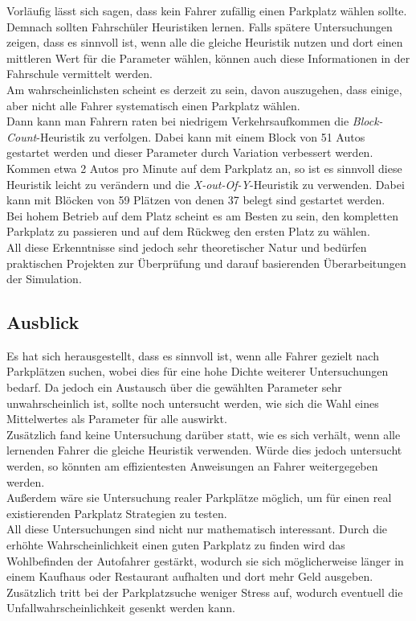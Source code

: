 Vorläufig lässt sich sagen, dass kein Fahrer zufällig einen Parkplatz wählen sollte. Demnach sollten Fahrschüler Heuristiken lernen. Falls spätere Untersuchungen zeigen, dass es sinnvoll ist, wenn alle die gleiche Heuristik nutzen und dort einen mittleren Wert für die Parameter wählen, können auch diese Informationen in der Fahrschule vermittelt werden.\\
Am wahrscheinlichsten scheint es derzeit zu sein, davon auszugehen, dass einige, aber nicht alle Fahrer systematisch einen Parkplatz wählen. \\
 Dann kann man Fahrern raten bei niedrigem Verkehrsaufkommen die \emph{Block-Count}-Heuristik zu verfolgen. Dabei kann mit einem Block von 51 Autos gestartet werden und dieser Parameter durch Variation verbessert werden.\\
 Kommen etwa 2 Autos pro Minute auf dem Parkplatz an, so ist es sinnvoll diese Heuristik leicht zu verändern und die \emph{X-out-Of-Y}-Heuristik zu verwenden. Dabei kann mit Blöcken von 59 Plätzen von denen 37 belegt sind gestartet werden.\\
 Bei hohem Betrieb auf dem Platz scheint es am Besten zu sein, den kompletten Parkplatz zu passieren und auf dem Rückweg den ersten Platz zu wählen.\\
All diese Erkenntnisse sind jedoch sehr theoretischer Natur und bedürfen praktischen Projekten zur Überprüfung und darauf basierenden Überarbeitungen der Simulation. 
 
 \subsection{Ausblick}

Es hat sich herausgestellt, dass es sinnvoll ist, wenn alle Fahrer gezielt nach Parkplätzen suchen, wobei dies für eine hohe Dichte weiterer Untersuchungen bedarf. Da jedoch ein Austausch über die gewählten Parameter sehr unwahrscheinlich ist, sollte noch untersucht werden, wie sich die Wahl eines Mittelwertes als Parameter für alle auswirkt.\\
Zusätzlich fand keine Untersuchung darüber statt, wie es sich verhält, wenn alle lernenden Fahrer die gleiche Heuristik verwenden. Würde dies jedoch untersucht werden, so könnten am effizientesten Anweisungen an Fahrer weitergegeben werden. \\
Außerdem wäre sie Untersuchung realer Parkplätze möglich, um für einen real existierenden Parkplatz Strategien zu testen.\\
All diese Untersuchungen sind nicht nur mathematisch interessant. Durch die erhöhte Wahrscheinlichkeit einen guten Parkplatz zu finden wird das Wohlbefinden der Autofahrer gestärkt, wodurch sie sich möglicherweise länger in einem Kaufhaus oder Restaurant aufhalten und dort mehr Geld ausgeben. Zusätzlich tritt bei der Parkplatzsuche weniger Stress auf, wodurch eventuell die Unfallwahrscheinlichkeit gesenkt werden kann.